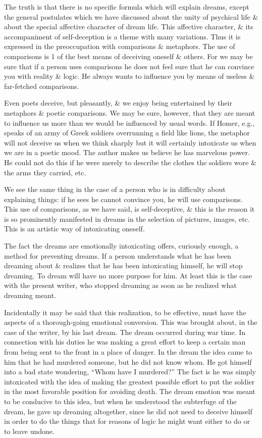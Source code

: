 \documentclass{article}
\begin{document}
The truth is that there is no specific formula which will explain dreams, except the general postulates which we have discussed about the unity of psychical life \& about the special affective character of dream life. This affective character, \& its accompaniment of self-deception is a theme with many variations. Thus it is expressed in the preoccupation with comparisons \& metaphors. The use of comparisons is 1 of the best means of deceiving oneself \& others. For we may be sure that if a person uses comparisons he does not feel sure that he can convince you with reality \& logic. He always wants to influence you by means of useless \& far-fetched comparisons.

Even poets deceive, but pleasantly, \& we enjoy being entertained by their metaphors \& poetic comparisons. We may be sure, however, that they are meant to influence us more than we would be influenced by usual words. If Homer, e.g., speaks of an army of Greek soldiers overrunning a field like lions, the metaphor will not deceive us when we think sharply but it will certainly intoxicate us when we are in a poetic mood. The author makes us believe he has marvelous power. He could not do this if he were merely to describe the clothes the soldiers wore \& the arms they carried, etc.

We see the same thing in the case of a person who is in difficulty about explaining things: if he sees he cannot convince you, he will use comparisons. This use of comparisons, as we have said, is self-deceptive, \& this is the reason it is so prominently manifested in dreams in the selection of pictures, images, etc. This is an artistic way of intoxicating oneself.

The fact the dreams are emotionally intoxicating offers, curiously enough, a method for preventing dreams. If a person understands what he has been dreaming about \& realizes that he has been intoxicating himself, he will stop dreaming. To dream will have no more purpose for him. At least this is the case with the present writer, who stopped dreaming as soon as he realized what dreaming meant.

Incidentally it may be said that this realization, to be effective, must have the aspects of a thorough-going emotional conversion. This was brought about, in the case of the writer, by his last dream. The dream occurred during war time. In connection with his duties he was making a great effort to keep a certain man from being sent to the front in a place of danger. In the dream the idea came to him that he had murdered someone, but he did not know whom. He got himself into a bad state wondering, ``Whom have I murdered?'' The fact is he was simply intoxicated with the idea of making the greatest possible effort to put the soldier in the most favorable position for avoiding death. The dream emotion was meant to be conducive to this idea, but when he understood the subterfuge of the dream, he gave up dreaming altogether, since he did not need to deceive himself in order to do the things that for reasons of logic he might want either to do or to leave undone.
\end{document}
